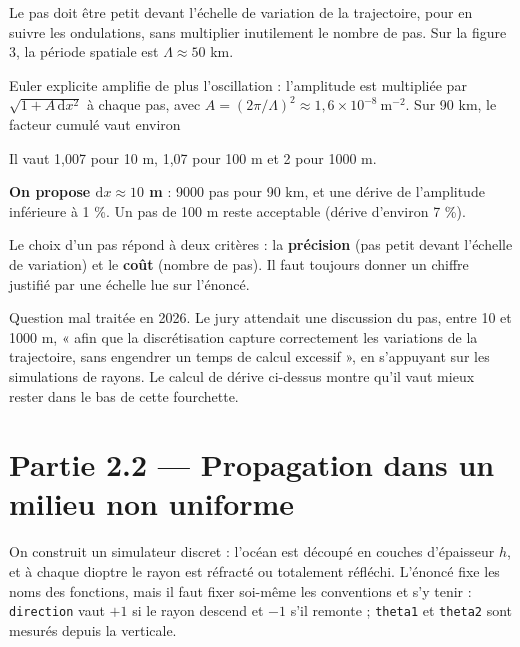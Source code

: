 \documentclass[11pt,a4paper]{article}
\newcommand{\equationajustee}[1]{%
  \sbox{\boiteequation}{$\displaystyle #1$}%
  \ifdim\wd\boiteequation>\linewidth
    \[\resizebox{\linewidth}{!}{\usebox{\boiteequation}}\]%
  \else
    \[#1\]%
  \fi}
\begin{document}
Le pas doit être petit devant l'échelle de variation de la trajectoire, pour en suivre les ondulations, sans multiplier inutilement le nombre de pas. Sur la figure 3, la période spatiale est \(\Lambda \approx 50\) km.

Euler explicite amplifie de plus l'oscillation : l'amplitude est multipliée par \(\sqrt{1 + A\,\mathrm{d}x^2}\) à chaque pas, avec \(A = (2\pi/\Lambda)^2 \approx 1{,}6 \times 10^{-8}\ \mathrm{m^{-2}}\). Sur 90 km, le facteur cumulé vaut environ

\equationajustee{e^{A\,\mathrm{d}x\,(x_f - x_0)/2}.}

Il vaut 1,007 pour 10 m, 1,07 pour 100 m et 2 pour 1000 m.

\textbf{On propose \(\mathrm{d}x \approx 10\) m} : 9000 pas pour 90 km, et une dérive de l'amplitude inférieure à 1 \%. Un pas de 100 m reste acceptable (dérive d'environ 7 \%).

\begin{methode}

Le choix d'un pas répond à deux critères : la \textbf{précision} (pas petit devant l'échelle de variation) et le \textbf{coût} (nombre de pas). Il faut toujours donner un chiffre justifié par une échelle lue sur l'énoncé.

\end{methode}

\begin{jury}

Question mal traitée en 2026. Le jury attendait une discussion du pas, entre 10 et 1000 m, « afin que la discrétisation capture correctement les variations de la trajectoire, sans engendrer un temps de calcul excessif », en s'appuyant sur les simulations de rayons. Le calcul de dérive ci-dessus montre qu'il vaut mieux rester dans le bas de cette fourchette.

\end{jury}

\hypertarget{partie-2.2-propagation-dans-un-milieu-non-uniforme}{%
\section{Partie 2.2 --- Propagation dans un milieu non uniforme}\label{partie-2.2-propagation-dans-un-milieu-non-uniforme}}

On construit un simulateur discret : l'océan est découpé en couches d'épaisseur \(h\), et à chaque dioptre le rayon est réfracté ou totalement réfléchi. L'énoncé fixe les noms des fonctions, mais il faut fixer soi-même les conventions et s'y tenir : \texttt{direction} vaut \(+1\) si le rayon descend et \(-1\) s'il remonte ; \texttt{theta1} et \texttt{theta2} sont mesurés depuis la verticale.
\end{document}

